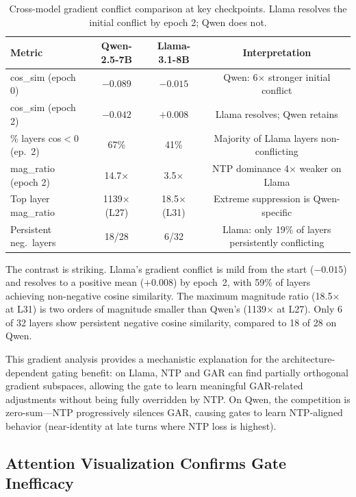\documentclass[11pt,a4paper]{article}
\begin{document}
\begin{table}[h]
\centering
\small
\caption{Cross-model gradient conflict comparison at key checkpoints. Llama resolves the initial conflict by epoch 2; Qwen does not.}
\label{tab:gradient_cross}
\begin{tabular}{lccc}
\toprule
\textbf{Metric} & \textbf{Qwen-2.5-7B} & \textbf{Llama-3.1-8B} & \textbf{Interpretation} \\
\midrule
cos\_sim (epoch 0) & $-0.089$ & $-0.015$ & Qwen: 6$\times$ stronger initial conflict \\
cos\_sim (epoch 2) & $-0.042$ & $+0.008$ & Llama resolves; Qwen retains \\
\% layers cos$<$0 (ep.\ 2) & 67\% & 41\% & Majority of Llama layers non-conflicting \\
mag\_ratio (epoch 2) & 14.7$\times$ & 3.5$\times$ & NTP dominance 4$\times$ weaker on Llama \\
Top layer mag\_ratio & 1139$\times$ (L27) & 18.5$\times$ (L31) & Extreme suppression is Qwen-specific \\
Persistent neg.\ layers & 18/28 & 6/32 & Llama: only 19\% of layers persistently conflicting \\
\bottomrule
\end{tabular}
\end{table}

The contrast is striking.
Llama's gradient conflict is mild from the start ($-0.015$) and resolves to a positive mean ($+0.008$) by epoch~2, with 59\% of layers achieving non-negative cosine similarity.
The maximum magnitude ratio (18.5$\times$ at L31) is two orders of magnitude smaller than Qwen's (1139$\times$ at L27).
Only 6 of 32 layers show persistent negative cosine similarity, compared to 18 of 28 on Qwen.

This gradient analysis provides a mechanistic explanation for the architecture-dependent gating benefit: on Llama, NTP and GAR can find partially orthogonal gradient subspaces, allowing the gate to learn meaningful GAR-related adjustments without being fully overridden by NTP.
On Qwen, the competition is zero-sum---NTP progressively silences GAR, causing gates to learn NTP-aligned behavior (near-identity at late turns where NTP loss is highest).

\subsection{Attention Visualization Confirms Gate Inefficacy}
\label{sec:attention}
\end{document}
